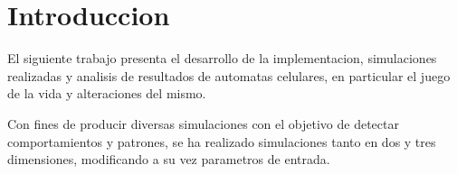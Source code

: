 \section{Introduccion}\label{sec:introduccion}
El siguiente trabajo presenta el desarrollo de la implementacion, simulaciones realizadas y analisis de resultados de
automatas celulares, en particular el juego de la vida y alteraciones del mismo.

Con fines de producir diversas simulaciones con el objetivo de detectar comportamientos y patrones, se ha realizado
simulaciones tanto en dos y tres dimensiones, modificando a su vez parametros de entrada.
